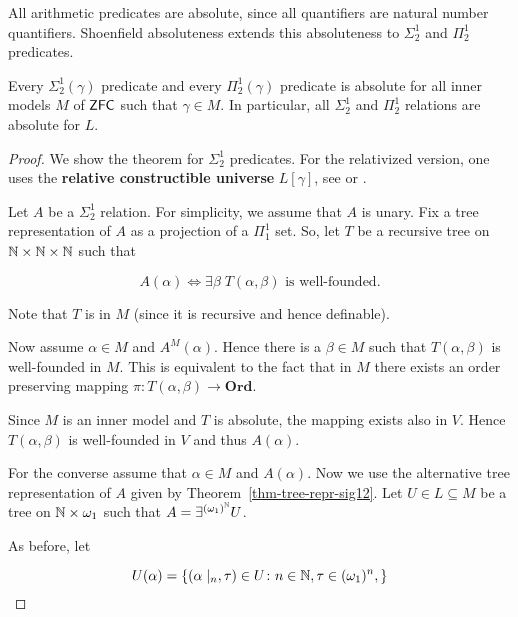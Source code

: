 All arithmetic predicates are absolute, since all quantifiers are natural number quantifiers. Shoenfield absoluteness extends this absoluteness to $\Sigma^1_2$ and $\Pi^1_2$ predicates.

\begin{theorem}\label{thm-shoenfild-absoluteness}Every $\Sigma^1_2(\gamma)$ predicate and every $\Pi^1_2(\gamma)$ predicate is absolute for all inner models $M$ of $\mathsf{ZFC}$ such that $\gamma \in M$. In particular, all $\Sigma^1_2$ and $\Pi^1_2$ relations are absolute for $L$.

\end{theorem}\begin{proof}We show the theorem for $\Sigma^1_2$ predicates. For the relativized version, one uses the \textbf{relative constructible universe} $L[\gamma]$, see \cite{jech2003a} or \cite{Kanamori:2003a}.

Let $A$ be a $\Sigma^1_2$ relation. For simplicity, we assume that $A$ is unary. Fix a tree representation of $A$ as a projection of a $\Pi^1_1$ set. So, let $T$ be a recursive tree on $\mathbb{N} \times \mathbb{N} \times \mathbb{N}$ such that

\begin{equation}
A(\alpha) \iff \exists \beta \;  T(\alpha,\beta) \text{ is well-founded}.
\end{equation}

Note that $T$ is in $M$ (since it is recursive and hence definable).

Now assume $\alpha \in M$ and $A^M(\alpha)$. Hence there is a $\beta \in M$ such that $T(\alpha,\beta)$ is well-founded in $M$. This is equivalent to the fact that in $M$ there exists an order preserving mapping $\pi: T(\alpha,\beta) \to \mathbf{Ord}$.

Since $M$ is an inner model and $T$ is absolute, the mapping exists also in $V$. Hence $T(\alpha,\beta)$ is well-founded in $V$ and thus $A(\alpha)$.

For the converse assume that $\alpha \in M$ and $A(\alpha)$. Now we use the alternative tree representation of $A$ given by Theorem~\ref{thm-tree-repr-sig12}. Let $U \in L \subseteq M$ be a tree on $\mathbb{N} \times \omega_1$ such that $A = \exists^{(\omega_1)^{\mathbb{N}}} U$.

As before, let

\begin{equation}
U(\alpha) = \{ (\alpha\mid_{n}, \tau)\in U \colon n \in \mathbb{N}, \tau \in (\omega_1)^n,  \}
\end{equation}


\end{proof}
